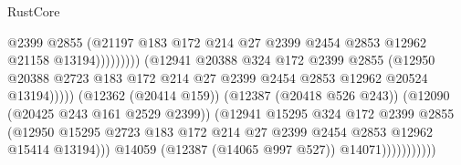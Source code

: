 \begin{lexlean}{RustCore}
\begin{coremodule}
                                                  @2399
                                                  @2855
                                                  (@21197
                                                    @183
                                                    @172
                                                    @214
                                                    @27
                                                    @2399
                                                    @2454
                                                    @2853
                                                    @12962
                                                    @21158
                                                    @13194)))))))))
                                  (@12941
                                    @20388
                                    @324
                                    @172
                                    @2399
                                    @2855
                                    (@12950
                                      @20388
                                      @2723
                                      @183
                                      @172
                                      @214
                                      @27
                                      @2399
                                      @2454
                                      @2853
                                      @12962
                                      @20524
                                      @13194)))))
                            (@12362 (@20414 @159))
                            (@12387 (@20418 @526 @243))
                            (@12090 (@20425 @243 @161 @2529 @2399))
                            (@12941
                              @15295
                              @324
                              @172
                              @2399
                              @2855
                              (@12950
                                @15295
                                @2723
                                @183
                                @172
                                @214
                                @27
                                @2399
                                @2454
                                @2853
                                @12962
                                @15414
                                @13194)))
                          @14059
                          (@12387 (@14065 @997 @527))
                          @14071)))))))))))

\end{coremodule}
\end{lexlean}
